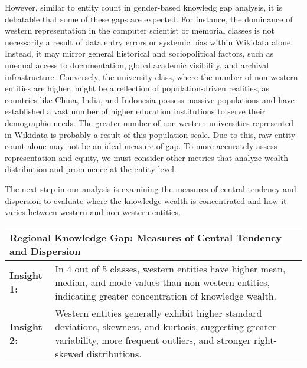However, similar to entity count in gender-based knowledg gap analysis, it is debatable that some of these gaps are expected. For instance, the dominance of western representation in the computer scientist or memorial classes is not necessarily a result of data entry errors or systemic bias within Wikidata alone. Instead, it may mirror general historical and sociopolitical factors, such as unequal access to documentation, global academic visibility, and archival infrastructure. Conversely, the university class, where the number of non-western entities are higher, might be a reflection of population-driven realities, as countries like China, India, and Indonesia possess massive populations and have established a vast number of higher education institutions to serve their demographic needs. The greater number of non-western universities represented in Wikidata is probably a result of this population scale. Due to this, raw entity count alone may not be an ideal measure of gap. To more accurately assess representation and equity, we must consider other metrics that analyze wealth distribution and prominence at the entity level.


The next step in our analysis is examining the measures of central tendency and dispersion to evaluate where the knowledge wealth is concentrated and how it varies between western and non-western entities.

\begin{table}[h]
    \centering
    \renewcommand{\arraystretch}{1.3}
    \begin{tabular}{|l p{12cm}|} 
        \hline
        \multicolumn{2}{|l|}{\textbf{Regional Knowledge Gap: Measures of Central Tendency and Dispersion}} \\
        \hline
        \textbf{Insight 1:} & In 4 out of 5 classes, western entities have higher mean, median, and mode values than non-western entities, indicating greater concentration of knowledge wealth. \\
        \textbf{Insight 2:} & Western entities generally exhibit higher standard deviations, skewness, and kurtosis, suggesting greater variability, more frequent outliers, and stronger right-skewed distributions. \\
        \hline
    \end{tabular}
\end{table}

